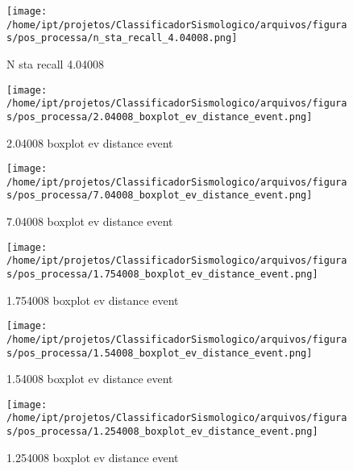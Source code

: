     \begin{figure}[H]
        \centering
        \texttt{[image: /home/ipt/projetos/ClassificadorSismologico/arquivos/figuras/pos\_processa/n\_sta\_recall\_4.04008.png]}
        \caption{N sta recall 4.04008}
        \label{fig:n_sta_recall_4.04008}
    \end{figure}
                

    \begin{figure}[H]
        \centering
        \texttt{[image: /home/ipt/projetos/ClassificadorSismologico/arquivos/figuras/pos\_processa/2.04008\_boxplot\_ev\_distance\_event.png]}
        \caption{2.04008 boxplot ev distance event}
        \label{fig:2.04008_boxplot_ev_distance_event}
    \end{figure}
                

    \begin{figure}[H]
        \centering
        \texttt{[image: /home/ipt/projetos/ClassificadorSismologico/arquivos/figuras/pos\_processa/7.04008\_boxplot\_ev\_distance\_event.png]}
        \caption{7.04008 boxplot ev distance event}
        \label{fig:7.04008_boxplot_ev_distance_event}
    \end{figure}
                

    \begin{figure}[H]
        \centering
        \texttt{[image: /home/ipt/projetos/ClassificadorSismologico/arquivos/figuras/pos\_processa/1.754008\_boxplot\_ev\_distance\_event.png]}
        \caption{1.754008 boxplot ev distance event}
        \label{fig:1.754008_boxplot_ev_distance_event}
    \end{figure}
                

    \begin{figure}[H]
        \centering
        \texttt{[image: /home/ipt/projetos/ClassificadorSismologico/arquivos/figuras/pos\_processa/1.54008\_boxplot\_ev\_distance\_event.png]}
        \caption{1.54008 boxplot ev distance event}
        \label{fig:1.54008_boxplot_ev_distance_event}
    \end{figure}
                

    \begin{figure}[H]
        \centering
        \texttt{[image: /home/ipt/projetos/ClassificadorSismologico/arquivos/figuras/pos\_processa/1.254008\_boxplot\_ev\_distance\_event.png]}
        \caption{1.254008 boxplot ev distance event}
        \label{fig:1.254008_boxplot_ev_distance_event}
    \end{figure}
                


